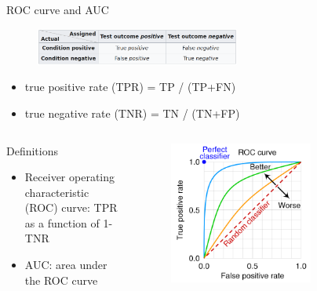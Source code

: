 \documentclass[xcolor=pdftex,dvipsnames,table,mathserif,aspectratio=169]{beamer}
\begin{document}
\begin{frame}{ROC curve and AUC }

  \begin{figure}[ht]
    \centering
    \includegraphics[width=0.6\textwidth]{contingency_table}
  \end{figure}

  \begin{itemize}
  \item true positive rate (TPR) = TP / (TP+FN)
  \item true negative rate (TNR) = TN / (TN+FP)
  \end{itemize}

\begin{columns}
  \begin{column}{.5\textwidth}
  \begin{block}{Definitions}
  \begin{itemize}
  \item Receiver operating characteristic (ROC) curve: TPR as a function of 1-TNR
  \item AUC: area under the ROC curve
  \end{itemize}
\end{block}

  \end{column}

  \begin{column}{.5\textwidth}
\begin{figure}[ht]
  \centering
  \includegraphics[width=0.7\textwidth]{roc_curve}
\end{figure}

  \end{column}
\end{columns}




\end{frame}
\end{document}
